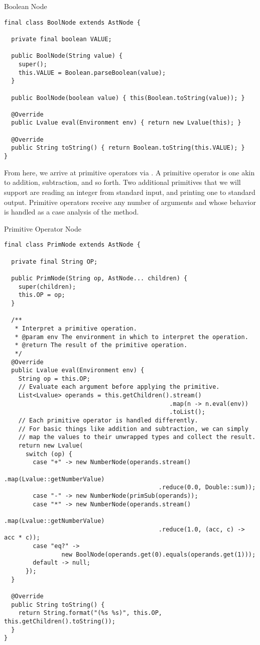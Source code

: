 \begin{cl}[]{Boolean Node}
\begin{lstlisting}[language=MyJava]
final class BoolNode extends AstNode {

  private final boolean VALUE;

  public BoolNode(String value) {
    super();
    this.VALUE = Boolean.parseBoolean(value);
  }

  public BoolNode(boolean value) { this(Boolean.toString(value)); }

  @Override
  public Lvalue eval(Environment env) { return new Lvalue(this); }

  @Override
  public String toString() { return Boolean.toString(this.VALUE); }
}
\end{lstlisting}
\end{cl}

From here, we arrive at primitive operators via . A primitive operator is one akin to addition, subtraction, and so forth. Two additional primitives that we will support are reading an integer from standard input, and printing one to standard output. Primitive operators receive any number of arguments and whose behavior is handled as a case analysis of the  method. 

\begin{cl}[]{Primitive Operator Node}
\begin{lstlisting}[language=MyJava]
final class PrimNode extends AstNode {

  private final String OP;

  public PrimNode(String op, AstNode... children) {
    super(children);
    this.OP = op;
  }

  /**
   * Interpret a primitive operation.
   * @param env The environment in which to interpret the operation.
   * @return The result of the primitive operation.
   */
  @Override
  public Lvalue eval(Environment env) {
    String op = this.OP;
    // Evaluate each argument before applying the primitive.
    List<Lvalue> operands = this.getChildren().stream()
                                              .map(n -> n.eval(env))
                                              .toList();
    // Each primitive operator is handled differently.
    // For basic things like addition and subtraction, we can simply
    // map the values to their unwrapped types and collect the result.
    return new Lvalue(
      switch (op) {
        case "+" -> new NumberNode(operands.stream()
                                           .map(Lvalue::getNumberValue)
                                           .reduce(0.0, Double::sum));
        case "-" -> new NumberNode(primSub(operands));
        case "*" -> new NumberNode(operands.stream()
                                           .map(Lvalue::getNumberValue)
                                           .reduce(1.0, (acc, c) -> acc * c));
        case "eq?" ->
                new BoolNode(operands.get(0).equals(operands.get(1)));
        default -> null;
      });
  }

  @Override
  public String toString() {
    return String.format("(%s %s)", this.OP, this.getChildren().toString());
  }
}
\end{lstlisting}
\end{cl}

